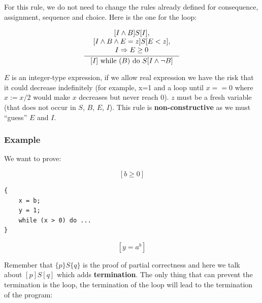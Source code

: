 \documentclass[12pt, a4paper]{book}
\begin{document}
    For this rule, we do not need to change the rules already defined for
    consequence, assignment, sequence and choice. Here is the one for the
    loop:

    \begin{center}
    \begin{minipage}{0.6\linewidth}
    \begin{framed}
    \[
    \inference{
        {\begin{array}{c}
            \lbrack I \land B \rbrack S [I], \\
            \lbrack I \land B \land E = z \rbrack S [E < z], \\
            I \Rightarrow E \ge 0
        \end{array}}
    }
    {[I] \textrm{ while } (B) \textrm{ do } S [I \land\lnot B]}
    \]
    \end{framed}
    \end{minipage}
    \end{center}

    $E$ is an integer-type expression, if we allow real expression we have the
    risk that it could decrease indefinitely (for example, x=1 and a loop until
    $x == 0$ where $x:=x/2$ would make $x$ decreases but never reach 0). $z$
    must be a fresh variable (that does not occur in $S$, $B$, $E$, $I$). This
    rule is \textbf{non-constructive} as we must \enquote{guess} $E$ and $I$.

    \subsubsection{Example}

    We want to prove:
    \begin{center}
    $$[b \ge 0]$$
    \begin{minipage}{0.4\linewidth}
\begin{lstlisting}
{
    x = b;
    y = 1;
    while (x > 0) do ...
}
\end{lstlisting}
    \end{minipage}
    $$[y = a^{b}]$$
    \end{center}

    \bigskip

    Remember that $\{ p \} S \{ q \}$ is the proof of partial correctness and
    here we talk about $[p] S [q]$ which adds \textbf{termination}. The only
    thing that can prevent the termination is the loop, the termination of the
    loop will lead to the termination of the program:
\end{document}
